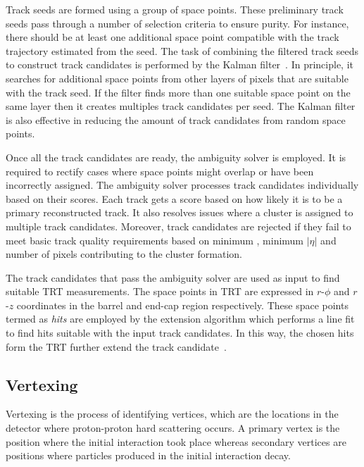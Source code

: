 Track seeds are formed using a group of space points. These preliminary track seeds pass through a 
number of selection criteria to ensure purity. For instance, there should be at least one 
additional space point compatible with the track trajectory estimated from the seed. The task of 
combining the filtered track seeds to construct track candidates is performed by 
the Kalman filter~\cite{FRUHWIRTH1987444}. In principle, it searches for additional space points from other layers of pixels that are suitable with the track seed. If the filter finds more than one suitable space 
point on the same layer then it creates multiples track candidates per seed. The 
Kalman filter is also effective in reducing the amount of track candidates from random space points. 

Once all the track candidates are ready, the ambiguity solver is employed. It is required to rectify 
cases where space points might overlap or have been incorrectly assigned. 
The ambiguity solver processes track candidates individually based on their scores. Each track gets a 
score based on how likely it is to be a primary reconstructed track. 
It also resolves issues where a cluster is assigned to multiple track candidates. Moreover, track 
candidates are rejected if they fail to meet basic track quality requirements based on
minimum \pT, minimum $|\eta|$ and number of pixels contributing to the cluster formation.

The track candidates that pass the ambiguity solver are used as input to find suitable TRT measurements.
The space points in TRT are expressed in $r$-$\phi$
and $r$-$z$ coordinates in the barrel and end-cap region respectively. These space points termed
as \textit{hits} are employed by the extension algorithm which performs
a line fit to find hits suitable with the input track candidates. In this way, the chosen hits form the TRT further extend the track candidate~\cite{T_Cornelissen_2008}.

\subsection{Vertexing}
Vertexing is the process of identifying vertices, which are the locations in the detector where proton-proton hard scattering occurs.
A primary vertex is the position where the initial interaction took place whereas secondary vertices
are positions where particles produced in the initial interaction decay.

